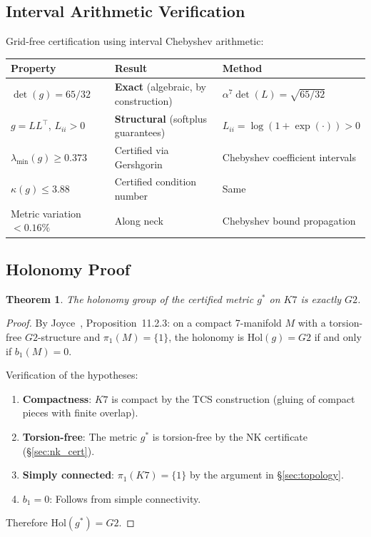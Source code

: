 \documentclass[11pt,a4paper]{article}
\newcommand{\Gtwo}{\mathrm{G}_2}
\newcommand{\Kseven}{K_7}
\newcommand{\Hol}{\mathrm{Hol}}
\newtheorem{theorem}{Theorem}[section]
\theoremstyle{remark}
\def\Gtwo{G2}%
\def\Kseven{K7}%
\begin{document}
\subsection{Interval Arithmetic Verification}\label{sec:interval}

Grid-free certification using interval Chebyshev arithmetic:

\begin{table}[H]
\centering
\begin{tabular}{lll}
\toprule
\textbf{Property} & \textbf{Result} & \textbf{Method} \\
\midrule
$\det(g) = 65/32$ & \textbf{Exact} (algebraic, by construction) & $\alpha^7 \det(L) = \sqrt{65/32}$ \\
$g = LL^\top$, $L_{ii} > 0$ & \textbf{Structural} (softplus guarantees) & $L_{ii} = \log(1+\exp(\cdot)) > 0$ \\
$\lambda_{\min}(g) \geq 0.373$ & Certified via Gershgorin & Chebyshev coefficient intervals \\
$\kappa(g) \leq 3.88$ & Certified condition number & Same \\
Metric variation $< 0.16\%$ & Along neck & Chebyshev bound propagation \\
\bottomrule
\end{tabular}
\end{table}

\subsection{Holonomy Proof}\label{sec:holonomy}

\begin{theorem}\label{thm:holonomy}
The holonomy group of the certified metric $g^*$ on $\Kseven$ is exactly $\Gtwo$.
\end{theorem}

\begin{proof}
By Joyce~\cite{joyce2000}, Proposition~11.2.3: on a compact 7-manifold $M$ with a
torsion-free $\Gtwo$-structure and $\pi_1(M) = \{1\}$, the holonomy is $\Hol(g) = \Gtwo$ if and only
if $b_1(M) = 0$.

Verification of the hypotheses:
\begin{enumerate}
    \item \textbf{Compactness}: $\Kseven$ is compact by the TCS construction (gluing of compact pieces
          with finite overlap).
    \item \textbf{Torsion-free}: The metric $g^*$ is torsion-free by the NK certificate (\S\ref{sec:nk_cert}).
    \item \textbf{Simply connected}: $\pi_1(\Kseven) = \{1\}$ by the argument in \S\ref{sec:topology}.
    \item $b_1 = 0$: Follows from simple connectivity.
\end{enumerate}
Therefore $\Hol(g^*) = \Gtwo$.
\end{proof}
\end{document}
